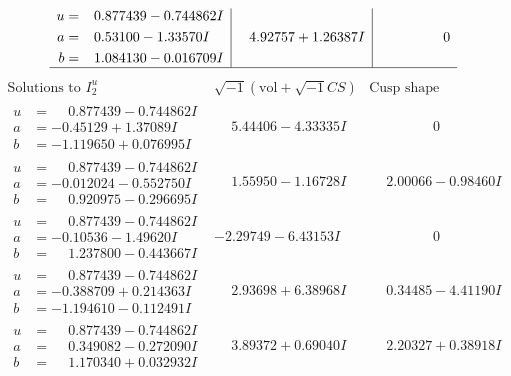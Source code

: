 \documentclass[1p]{elsarticle_modified}
\theoremstyle{definition}
\newcommand{\I}{\sqrt{-1}}
\begin{document}
$$\begin{array}{c|c|c}
\begin{aligned}
u &= \phantom{-}0.877439 - 0.744862 I \\
a &= \phantom{-}0.53100 - 1.33570 I \\
b &= \phantom{-}1.084130 - 0.016709 I\end{aligned}
 & \phantom{-}4.92757 + 1.26387 I & \phantom{-0.000000 } 0\\
 \hline 
 \end{array}$$\newpage$$\begin{array}{c|c|c}  
\text{Solutions to }I^u_{2}& \I (\text{vol} + \sqrt{-1}CS) & \text{Cusp shape}\\
 \hline 
\begin{aligned}
u &= \phantom{-}0.877439 - 0.744862 I \\
a &= -0.45129 + 1.37089 I \\
b &= -1.119650 + 0.076995 I\end{aligned}
 & \phantom{-}5.44406 - 4.33335 I & \phantom{-0.000000 } 0 \\ \hline\begin{aligned}
u &= \phantom{-}0.877439 - 0.744862 I \\
a &= -0.012024 - 0.552750 I \\
b &= \phantom{-}0.920975 - 0.296695 I\end{aligned}
 & \phantom{-}1.55950 - 1.16728 I & \phantom{-}2.00066 - 0.98460 I \\ \hline\begin{aligned}
u &= \phantom{-}0.877439 - 0.744862 I \\
a &= -0.10536 - 1.49620 I \\
b &= \phantom{-}1.237800 - 0.443667 I\end{aligned}
 & -2.29749 - 6.43153 I & \phantom{-0.000000 } 0 \\ \hline\begin{aligned}
u &= \phantom{-}0.877439 - 0.744862 I \\
a &= -0.388709 + 0.214363 I \\
b &= -1.194610 - 0.112491 I\end{aligned}
 & \phantom{-}2.93698 + 6.38968 I & \phantom{-}0.34485 - 4.41190 I \\ \hline\begin{aligned}
u &= \phantom{-}0.877439 - 0.744862 I \\
a &= \phantom{-}0.349082 - 0.272090 I \\
b &= \phantom{-}1.170340 + 0.032932 I\end{aligned}
 & \phantom{-}3.89372 + 0.69040 I & \phantom{-}2.20327 + 0.38918 I \\ \hline\begin{aligned}

\end{aligned}
\end{array}$$
\end{document}
